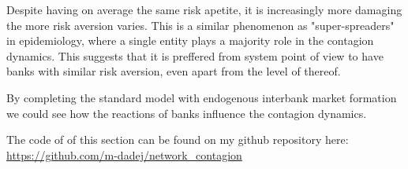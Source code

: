 \documentclass{article}
\begin{document}
Despite having on average the same risk apetite, it is increasingly more damaging the more risk aversion varies. This is a similar phenomenon as "super-spreaders" in epidemiology, where a single entity plays a majority role in the contagion dynamics. This suggests that it is preffered from system point of view to have banks with similar risk aversion, even apart from the level of thereof.

By completing the standard model with endogenous interbank market formation we could see how the reactions of banks influence the contagion dynamics.

The code of of this section can be found on my github repository here: \url{https://github.com/m-dadej/network_contagion}

\medskip

\newpage


\end{document}

